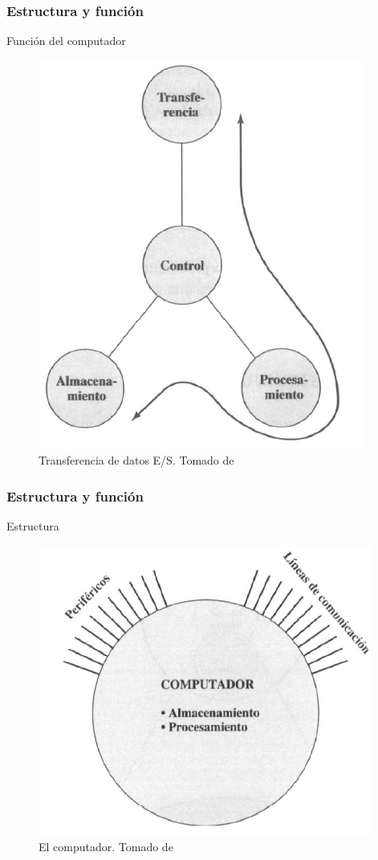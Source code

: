 \documentclass{beamer}
\begin{document}
		\begin{frame}
 		\frametitle{Estructura y función}
		\begin{block}{Función del computador}
\begin{figure}[H]
\centering
\includegraphics[scale=0.4]{imagenes/pc7.png}
\caption{Transferencia de datos E/S. Tomado de \cite{stallings}}
\end{figure}
		\end{block}
	\end{frame}	
	\begin{frame}
 		\frametitle{Estructura y función}
		\begin{block}{Estructura}
\begin{figure}[H]
\centering
\includegraphics[scale=0.45]{imagenes/pc8.png}
\caption{El computador. Tomado de \cite{stallings}}
\end{figure}
		\end{block}
	\end{frame}
\end{document}
